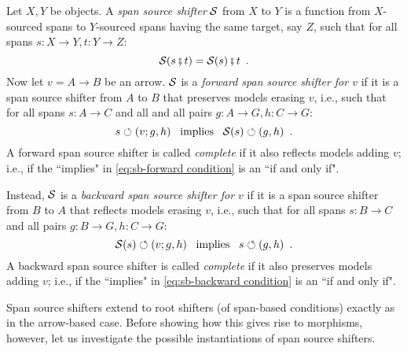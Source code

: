 \begin{definition}
Let $X,Y$ be objects. A \emph{span source shifter} $\mathcal{S}$ from $X$ to $Y$ is a function from $X$-sourced spans to $Y$-sourced spans having the same target, say $Z$, such that for all spans $s:X\to Y,t:Y\to Z$:
%
\begin{equation}\eqlabel{span shifters are functors}
\cS(s \spcomp t) = \cS(s)\spcomp t \enspace.
\end{equation}
%
Now let $v=A\to B$ be an arrow. $\mathcal{S}$ is a \emph{forward span source shifter for $v$} if it is a span source shifter from $A$ to $B$ that preserves models erasing $v$, i.e., such that for all spans $s:A\to C$ and all and all pairs $g:A\to G,h:C \to G$:
%
\begin{equation}\eqlabel{sb-forward condition}
s\commutes (v;g,h) \enspace\text{ implies }\enspace \cS(s) \commutes (g,h) \enspace.
\end{equation}
%
A forward span source shifter is called \emph{complete} if it also reflects models adding $v$; i.e., if the ``implies" in \eqref{eq:sb-forward condition} is an ``if and only if".

Instead, $\mathcal{S}$ is a \emph{backward span source shifter for $v$} if it is a span source shifter from $B$ to $A$ that reflects models erasing $v$, i.e., such that for all spans $s:B\to C$ and all pairs $g:B\to G,h:C\to G$:
%
\begin{equation}\eqlabel{sb-backward condition}
\cS(s) \commutes (v;g,h) \enspace\text{ implies }\enspace s\commutes (g,h) \enspace.
\end{equation}
%
A backward span source shifter is called \emph{complete} if it also preserves models adding $v$; i.e., if the ``implies" in \eqref{eq:sb-backward condition} is an ``if and only if".
\end{definition}
%
Span source shifters extend to root shifters (of span-based conditions) exactly as in the arrow-based case. Before showing how this gives rise to morphisms, however, let us investigate the possible instantiations of span source shifters.

